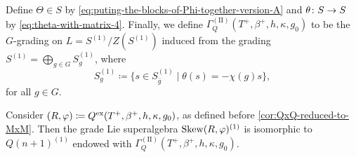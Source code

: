 \begin{defi}
    Define ${\Theta \in S}$ by \cref{eq:puting-the-blocks-of-Phi-together-version-A} and ${\theta\colon S \to S}$ by
    \cref{eq:theta-with-matrix-4}. 
    Finally, we define $\Gamma_Q^{\mathrm{(II)}}(T^+, \beta^+, h, \kappa, g_0)$ to be the $G$-grading on $L = S^{(1)}/Z(S^{(1)})$ induced from the grading $S^{(1)} = \bigoplus_{g\in G} S^{(1)}_g$, where
    \[
        S^{(1)}_{g} \coloneqq \{ s\in S^{(1)}_{\bar g} \mid \theta (s) = - \chi(g) s \},
    \]
    for all $g\in G$. 
\end{defi}


\begin{prop}\label{prop:Q-Type-II-correspondence}
    Consider $(R, \varphi) \coloneqq Q^{\mathrm{ex}}(T^+, \beta^+, h, \kappa, g_0)$, as defined before \cref{cor:QxQ-reduced-to-MxM}. 
    Then the grade Lie superalgebra $\operatorname{Skew} (R,\varphi)^{(1)}$ is isomorphic to $Q(n+1)^{(1)}$ endowed with $\Gamma_Q^{\mathrm{(II)}}(T^+, \beta^+, h, \kappa, g_0)$. 
\end{prop}


